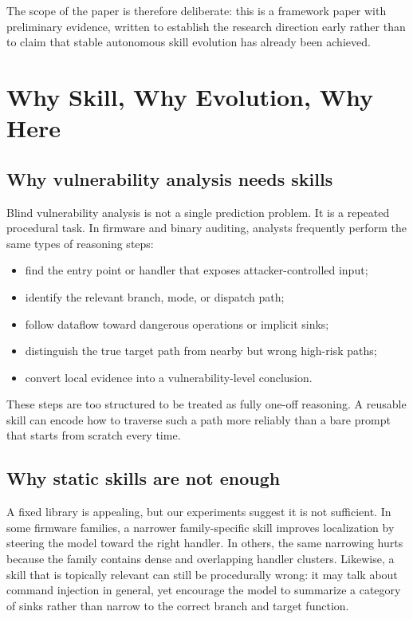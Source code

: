 \documentclass[11pt]{article}
\begin{document}
The scope of the paper is therefore deliberate: this is a framework paper with
preliminary evidence, written to establish the research direction early rather than to
claim that stable autonomous skill evolution has already been achieved.

\section{Why Skill, Why Evolution, Why Here}
\label{sec:why}

\subsection{Why vulnerability analysis needs skills}

Blind vulnerability analysis is not a single prediction problem.  It is a repeated
procedural task.  In firmware and binary auditing, analysts frequently perform the same
types of reasoning steps:
\begin{itemize}[leftmargin=*]
    \item find the entry point or handler that exposes attacker-controlled input;
    \item identify the relevant branch, mode, or dispatch path;
    \item follow dataflow toward dangerous operations or implicit sinks;
    \item distinguish the true target path from nearby but wrong high-risk paths;
    \item convert local evidence into a vulnerability-level conclusion.
\end{itemize}

These steps are too structured to be treated as fully one-off reasoning.  A reusable
skill can encode how to traverse such a path more reliably than a bare prompt that
starts from scratch every time.

\subsection{Why static skills are not enough}

A fixed library is appealing, but our experiments suggest it is not sufficient.  In some
firmware families, a narrower family-specific skill improves localization by steering the
model toward the right handler.  In others, the same narrowing hurts because the family
contains dense and overlapping handler clusters.  Likewise, a skill that is topically
relevant can still be procedurally wrong: it may talk about command injection in
general, yet encourage the model to summarize a category of sinks rather than narrow to
the correct branch and target function.
\end{document}
